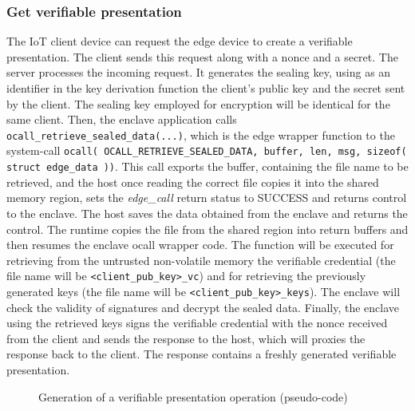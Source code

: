 \subsubsection{Get verifiable presentation}
The IoT client device can request the edge device to create a verifiable presentation.
The client sends this request along with a nonce and a secret. The server processes the incoming request. It generates the sealing key, using as an identifier in the key derivation function the client's public key and the secret sent by the client. The sealing key employed for encryption will be identical for the same client. 
Then, the enclave application calls \texttt{ocall\_retrieve\_sealed\_data(...)}, which is the edge wrapper function to the system-call \texttt{ocall( OCALL\_RETRIEVE\_SEALED\_DATA, buffer, len, msg, sizeof( struct edge\_data ))}. This call exports the buffer, containing the file name to be retrieved, and the host once reading the correct file copies it into the shared memory region, sets the \textit{edge\_call} return status to SUCCESS and returns control to the enclave. The host saves the data obtained from the enclave and returns the control. The runtime copies the file from the shared region into return buffers and then resumes the enclave ocall wrapper code.
The function will be executed for retrieving from the untrusted non-volatile memory the verifiable credential (the file name will be \texttt{<client\_pub\_key>\_vc}) and for retrieving the previously generated keys (the file name will be \texttt{<client\_pub\_key>\_keys}).
The enclave will check the validity of signatures and decrypt the sealed data.  
Finally, the enclave using the retrieved keys signs the verifiable credential with the nonce received from the client and sends the response to the host, which will proxies the response back to the client. The response contains a freshly generated verifiable presentation. \\

\begin{figure}[!tb]
    \centering
    
    \caption{Generation of a verifiable presentation operation (pseudo-code)}
    \label{poc-get-vp}
\end{figure}